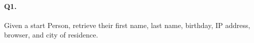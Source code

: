 \paragraph{Q1.}

Given a start Person, retrieve their first name, last name, birthday, IP
address, browser, and city of residence.
